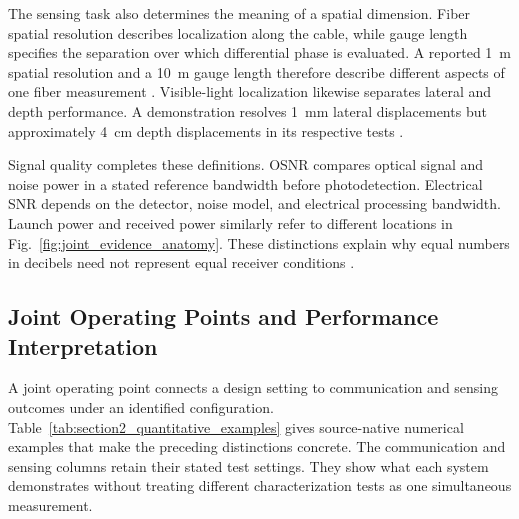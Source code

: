 The sensing task also determines the meaning of a spatial dimension.
Fiber spatial resolution describes localization along the cable, while gauge
length specifies the separation over which differential phase is evaluated.
A reported 1~m spatial resolution and a 10~m gauge length therefore describe
different aspects of one fiber measurement \cite{OISAC_SCR00057}.
Visible-light localization likewise separates lateral and depth performance.
A demonstration resolves 1~mm lateral displacements but approximately 4~cm
depth displacements in its respective tests \cite{OISAC_SCR00196}.

Signal quality completes these definitions. OSNR compares optical signal and
noise power in a stated reference bandwidth before photodetection. Electrical
SNR depends on the detector, noise model, and electrical processing bandwidth.
Launch power and received power similarly refer to different locations in
Fig.~\ref{fig:joint_evidence_anatomy}. These distinctions explain why equal
numbers in decibels need not represent equal receiver conditions
\cite{OISAC_SCR00220,OISAC_SCR01180}.

\subsection{Joint Operating Points and Performance Interpretation}
\label{sec:joint_performance_interpretation}

A joint operating point connects a design setting to communication and
sensing outcomes under an identified configuration.
Table~\ref{tab:section2_quantitative_examples} gives source-native numerical
examples that make the preceding distinctions concrete. The communication
and sensing columns retain their stated test settings. They show what each
system demonstrates without treating different characterization tests as one
simultaneous measurement.

